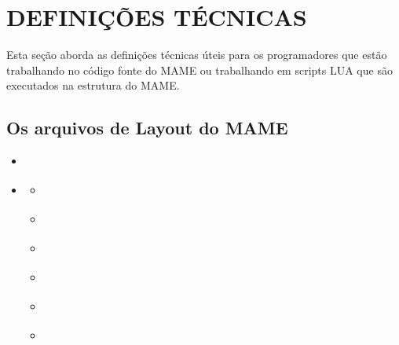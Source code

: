 \documentclass[letterpaper,10pt,brazil]{sphinxmanual}
\begin{document}
\chapter{DEFINIÇÕES TÉCNICAS}
\label{techspecs/index::doc}\label{techspecs/index:definicoes-tecnicas}
Esta seção aborda as definições técnicas úteis para os programadores
que estão trabalhando no código fonte do MAME ou trabalhando em
scripts LUA que são executados na estrutura do MAME.


\section{Os arquivos de Layout do MAME}
\label{techspecs/layout_files::doc}\label{techspecs/layout_files:os-arquivos-de-layout-do-mame}
\begin{sphinxShadowBox}
\begin{itemize}
\item {} 
\label{techspecs/layout_files:id19}{\hyperref[techspecs/layout_files:introducao]{}}

\item {} 
\label{techspecs/layout_files:id20}{\hyperref[techspecs/layout_files:conceitos\string-fundamentais]{}}
\begin{itemize}
\item {} 
\label{techspecs/layout_files:id21}{\hyperref[techspecs/layout_files:numeros]{}}

\item {} 
\label{techspecs/layout_files:id22}{\hyperref[techspecs/layout_files:coordenadas]{}}

\item {} 
\label{techspecs/layout_files:id23}{\hyperref[techspecs/layout_files:cores]{}}

\item {} 
\label{techspecs/layout_files:id24}{\hyperref[techspecs/layout_files:parametros]{}}

\item {} 
\label{techspecs/layout_files:id25}{\hyperref[techspecs/layout_files:parametros\string-predefinidos]{}}

\item {} 
\label{techspecs/layout_files:id26}{\hyperref[techspecs/layout_files:camadas]{}}


\end{itemize}
\end{itemize}
\end{sphinxShadowBox}
\end{document}
